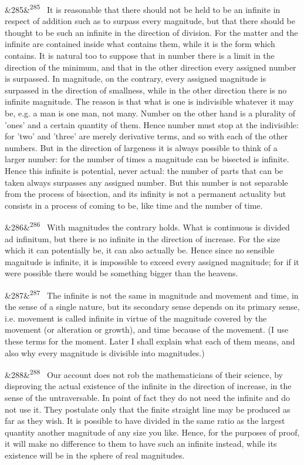 \documentclass[12pt]{article}
\newcommand{\para}[1][]{\par\noindent\ifx&#1&\else\textsuperscript{\footnotesize #1}~\fi}
\begin{document}
\para[285] It is reasonable that there should not be held to be an infinite in respect of addition such as to surpass every magnitude, but that there should be thought to be such an infinite in the direction of division. For the matter and the infinite are contained inside what contains them, while it is the form which contains. It is natural too to suppose that in number there is a limit in the direction of the minimum, and that in the other direction every assigned number is surpassed. In magnitude, on the contrary, every assigned magnitude is surpassed in the direction of smallness, while in the other direction there is no infinite magnitude. The reason is that what is one is indivisible whatever it may be, e.g. a man is one man, not many. Number on the other hand is a plurality of 'ones' and a certain quantity of them. Hence number must stop at the indivisible: for 'two' and 'three' are merely derivative terms, and so with each of the other numbers. But in the direction of largeness it is always possible to think of a larger number: for the number of times a magnitude can be bisected is infinite. Hence this infinite is potential, never actual: the number of parts that can be taken always surpasses any assigned number. But this number is not separable from the process of bisection, and its infinity is not a permanent actuality but consists in a process of coming to be, like time and the number of time.

\para[286] With magnitudes the contrary holds. What is continuous is divided ad infinitum, but there is no infinite in the direction of increase. For the size which it can potentially be, it can also actually be. Hence since no sensible magnitude is infinite, it is impossible to exceed every assigned magnitude; for if it were possible there would be something bigger than the heavens.

\para[287] The infinite is not the same in magnitude and movement and time, in the sense of a single nature, but its secondary sense depends on its primary sense, i.e. movement is called infinite in virtue of the magnitude covered by the movement (or alteration or growth), and time because of the movement. (I use these terms for the moment. Later I shall explain what each of them means, and also why every magnitude is divisible into magnitudes.)

\para[288] Our account does not rob the mathematicians of their science, by disproving the actual existence of the infinite in the direction of increase, in the sense of the untraversable. In point of fact they do not need the infinite and do not use it. They postulate only that the finite straight line may be produced as far as they wish. It is possible to have divided in the same ratio as the largest quantity another magnitude of any size you like. Hence, for the purposes of proof, it will make no difference to them to have such an infinite instead, while its existence will be in the sphere of real magnitudes.
\end{document}
